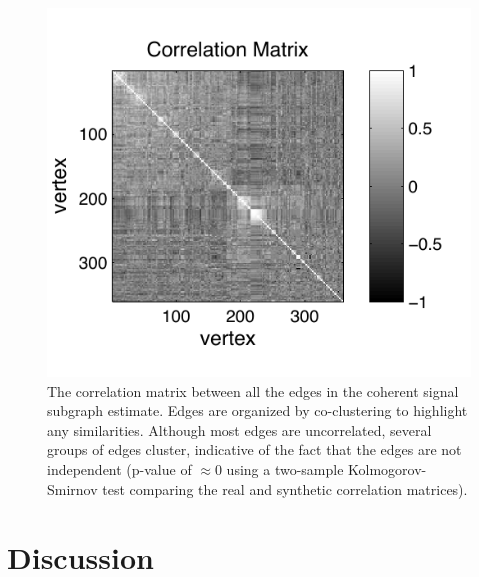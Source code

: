 \documentclass[10pt,journal,cspaper,compsoc]{IEEEtran}
\begin{document}
\begin{figure}[htbp]
	\centering
		\includegraphics[width=1.0\linewidth]{../figs/BLSA0317_coclustered_corr.pdf}
	\caption{The correlation matrix between all the edges in the coherent signal subgraph estimate. Edges are organized by co-clustering to highlight any similarities.  Although most edges are uncorrelated, several groups of edges cluster, indicative of the fact that the edges are not independent (p-value of $\approx 0$ using a two-sample Kolmogorov-Smirnov test comparing the real and synthetic correlation matrices). }
	\label{fig:cov}
\end{figure}












\section{Discussion} %
\label{sec:discussion}
\end{document}
